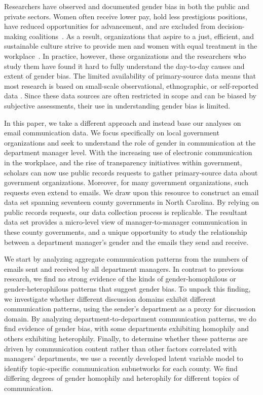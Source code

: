\documentclass{pnastwo}
\begin{document}
\begin{article}
Researchers have observed and documented gender bias in both the
public and private sectors. Women often receive lower pay, hold less
prestigious positions, have reduced opportunities for advancement, and
are excluded from decision-making coalitions~\citep{Brass1985,
  Bielby1986a, Ibarra1992, Albrecht2003, Duncan2004}. As a result,
organizations that aspire to a just, efficient, and sustainable
culture strive to provide men and women with equal treatment in the
workplace~\citep{Ely2000}. In practice, however, these organizations
and the researchers who study them have found it hard to fully
understand the day-to-day causes and extent of gender bias. The
limited availability of primary-source data means that most research
is based on small-scale observational, ethnographic, or self-reported
data \citep[e.g.,][]{Castilla2005, Adams2007, Elsesser2011}. Since
these data sources are often restricted in scope and can be biased by
subjective assessments, their use in understanding gender bias is
limited.

In this paper, we take a different approach and instead base our
analyses on email communication data. We focus specifically on local
government organizations and seek to understand the role of gender in
communication at the department manager level. With the increasing use
of electronic communication in the workplace, and the rise of
transparency initiatives within government, scholars can now use
public records requests to gather primary-source data about government
organizations. Moreover, for many government organizations, such
requests even extend to emails. We draw upon this resource to
construct an email data set spanning seventeen county governments in
North Carolina. By relying on public records requests, our data
collection process is replicable. The resultant data set provides a
micro-level view of manager-to-manager communication in these county
governments, and a unique opportunity to study the relationship
between a department manager's gender and the emails they send and
receive.

We start by analyzing aggregate communication patterns from the
numbers of emails sent and received by all department managers. In
contrast to previous research, we find no strong evidence of the kinds
of gender-homophilous or gender-heterophilous patterns that suggest
gender bias. To unpack this finding, we investigate whether different
discussion domains exhibit different communication patterns, using the
sender's department as a proxy for discussion domain. By analyzing
department-to-department communication patterns, we do find evidence
of gender bias, with some departments exhibiting homophily and others
exhibiting heterophily. Finally, to determine whether these patterns
are driven by communication content rather than other factors
correlated with managers' departments, we use a recently developed
latent variable model to identify topic-specific communication
subnetworks for each county. We find differing degrees of gender
homophily and heterophily for different topics of communication.



\end{article}
\end{document}
